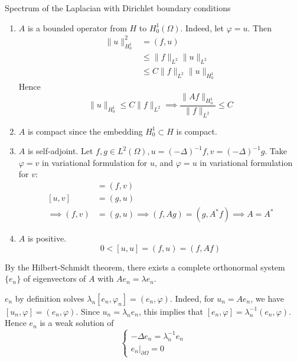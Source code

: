 \documentclass{report}
\begin{document}
\begin{example}{Spectrum of the Laplacian with Dirichlet boundary conditions}{}
    \begin{enumerate}
        \item \(A\) is a bounded operator from \(H\) to \(H^{1}_{0}(\Omega)\). Indeed, let \(\varphi = u\). Then
        \begin{align*}
            \|u\|_{H^{1}_{0}}^{2} &= (f, u) \\
            &\leq \|f\|_{L^{2}}\|u\|_{L^{2}} \\
            &\leq C\|f\|_{L^{2}}\|u\|_{H^{1}_{0}}
        \end{align*}
        Hence 
        \[
            \|u\|_{H^{1}_{0}} \leq C \|f\|_{L^{2}} \implies \frac{\|Af\|_{H^{1}_{0}}}{\|f\|_{L^{2}}} \leq C
        \]
        \item \(A\) is compact since the embedding \(H^{1}_{0} \subset H\) is compact.
        \item \(A\) is self-adjoint. Let \(f, g \in L^{2}(\Omega), u = (- \Delta)^{-1}f, v = (- \Delta)^{-1}g\). Take \(\varphi = v\) in variational formulation for \(u\), and \(\varphi = u\) in variational formulation for \(v\):
        \begin{align*}
            [u, v] &= (f, v) \\
            [u, v] &= (g, u) \\
            \implies (f, v) &= (g, u) \implies (f, Ag) = (g, A^{*}f) \implies A = A^{*}
        \end{align*}
        \item \(A\) is positive.
        \[
            0 < [u, u] = (f, u) = (f, Af)
        \]    
    \end{enumerate}
    By the Hilbert-Schmidt theorem, there exists a complete orthonormal system \(\{e_{n}\}\) of eigenvectors of \(A\) with \(Ae_{n} = \lambda e_{n}\). 
        
    \(e_{n}\) by definition solves \(\lambda_{n}[e_{n}, \varphi_{n}] = (e_{n}, \varphi)\). Indeed, for \(u_{n} = Ae_{n}\), we have \([u_{n}, \varphi] = (e_{n}, \varphi)\). Since \(u_{n} = \lambda_{n}e_{n}\), this implies that \([e_{n}, \varphi] = \lambda_{n}^{-1}(e_{n}, \varphi)\). Hence \(e_{n}\) is a weak solution of
    \begin{equation*}
        \begin{cases}
            - \Delta e_{n} = \lambda_{n}^{-1}e_{n} \\
            \left. e_{n} \right|_{\partial \Omega} = 0
        \end{cases}
    \end{equation*}

\end{example}
\end{document}
